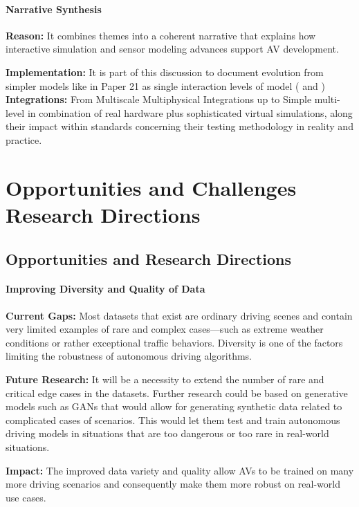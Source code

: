 \documentclass[lettersize,journal]{IEEEtran}
\begin{document}
\paragraph{Narrative Synthesis}

\textbf{Reason:} It combines themes into a coherent narrative that explains how interactive simulation and sensor modeling advances support AV development.

\textbf{Implementation:} It is part of this discussion to document evolution from simpler models like in Paper 21 as single interaction levels of model (\cite{ref64} and \cite{ref65}) \\
\textbf{Integrations:} From Multiscale Multiphysical Integrations up to Simple multi-level in combination of real hardware plus sophisticated virtual simulations, along their impact within standards concerning their testing methodology in reality and practice.



\section{Opportunities and Challenges Research Directions}

\subsection{Opportunities and Research Directions}

\paragraph{Improving Diversity and Quality of Data}

\textbf{Current Gaps:} Most datasets that exist are ordinary driving scenes and contain very limited examples of rare and complex cases—such as extreme weather conditions or rather exceptional traffic behaviors. Diversity is one of the factors limiting the robustness of autonomous driving algorithms.

\textbf{Future Research:} It will be a necessity to extend the number of rare and critical edge cases in the datasets. Further research could be based on generative models such as GANs that would allow for generating synthetic data related to complicated cases of scenarios. This would let them test and train autonomous driving models in situations that are too dangerous or too rare in real-world situations.

\textbf{Impact:} The improved data variety and quality allow AVs to be trained on many more driving scenarios and consequently make them more robust on real-world use cases.
\end{document}
